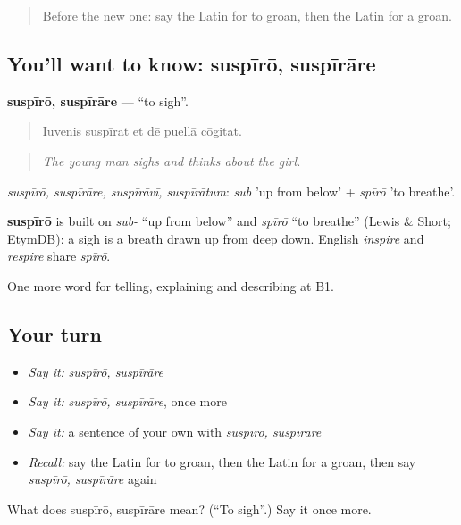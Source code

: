 \label{lesson:LA-C491-suspiro}



\begin{quote}
Before the new one: say the Latin for to groan, then the Latin for a groan.
\end{quote}

\subsection*{You'll want to know: suspīrō, suspīrāre}
\textbf{suspīrō, suspīrāre} — \textquotedblleft{}to sigh\textquotedblright{}.

\begin{quote}
Iuvenis suspīrat et dē puellā cōgitat.
\end{quote}

\begin{quote}
\emph{The young man sighs and thinks about the girl.}
\end{quote}

\emph{suspīrō, suspīrāre, suspīrāvī, suspīrātum}: \emph{sub} 'up from below' + \emph{spīrō} 'to breathe'.

\begin{cousinweb}
\textbf{suspīrō} is built on \emph{sub-} \textquotedblleft{}up from below\textquotedblright{} and \emph{spīrō} \textquotedblleft{}to breathe\textquotedblright{} (Lewis \& Short; EtymDB): a sigh is a breath drawn up from deep down. English \emph{inspire} and \emph{respire} share \emph{spīrō}.
\end{cousinweb}

\begin{grammarlens}[title={What you've built}]
One more word for telling, explaining and describing at B1.
\end{grammarlens}

\subsection*{Your turn}
\begin{itemize}
\raggedright
  \item \emph{Say it:} \emph{suspīrō, suspīrāre}
  \item \emph{Say it:} \emph{suspīrō, suspīrāre}, once more
  \item \emph{Say it:} a sentence of your own with \emph{suspīrō, suspīrāre}
  \item \emph{Recall:} say the Latin for to groan, then the Latin for a groan, then say \emph{suspīrō, suspīrāre} again
\end{itemize}

\begin{tcolorbox}[breakable,colback=teal!4,colframe=teal!35!black,title={Before you move on}]
What does suspīrō, suspīrāre mean? (\textquotedblleft{}To sigh\textquotedblright{}.) Say it once more.
\end{tcolorbox}
